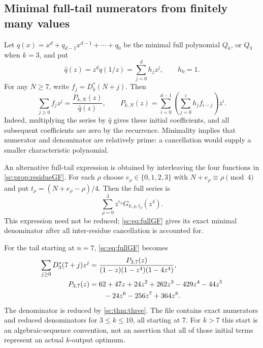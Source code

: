 \documentclass[11pt,a4paper]{article}
\numberwithin{equation}{section}
\theoremstyle{definition}
\theoremstyle{remark}
\begin{document}
\subsection{Minimal full-tail numerators from finitely many values}
Let $q(x)=x^d+q_{d-1}x^{d-1}+\cdots+q_0$ be the minimal full
polynomial $Q_k$, or $Q_3$ when $k=3$, and put
\begin{equation}\label{sc:eq:reciprocal}
 \widehat q(z)=z^dq(1/z)=\sum_{j=0}^d h_jz^j,\qquad h_0=1.
\end{equation}
For any $N\ge7$, write $f_j=D^*_k(N+j)$. Then
\begin{equation}\label{sc:eq:fullGF}
 \sum_{j\ge0}f_jz^j=\frac{P_{k,N}(z)}{\widehat q(z)},\qquad
 P_{k,N}(z)=\sum_{i=0}^{d-1}
       \left(\sum_{j=0}^{i}h_jf_{i-j}\right)z^i.
\end{equation}
Indeed, multiplying the series by $\widehat q$ gives these initial
coefficients, and all subsequent coefficients are zero by the recurrence.
Minimality implies that numerator and denominator are relatively prime:
a cancellation would supply a smaller characteristic polynomial.

An alternative full-tail expression is obtained by interleaving the four
functions in \cref{sc:prop:residueGF}. For each $\rho$ choose
$e_\rho\in\{0,1,2,3\}$ with $N+e_\rho\equiv\rho\pmod4$ and put
$t_\rho=(N+e_\rho-\rho)/4$. Then the full series is
\[
 \sum_{\rho=0}^3 z^{e_\rho}G_{k,\rho,t_\rho}(z^4).
\]
This expression need not be reduced; \eqref{sc:eq:fullGF} gives its exact
minimal denominator after all inter-residue cancellation is accounted for.

\begin{example}
For the tail starting at $n=7$, \eqref{sc:eq:fullGF} becomes
\begin{align}
 \sum_{j\ge0}D_3^*(7+j)z^j
 &=\frac{P_{3,7}(z)}{(1-z)(1-z^4)(1-4z^4)},\label{sc:eq:GF3}\\
 P_{3,7}(z)
 &=62+47z+24z^2+262z^3-429z^4-44z^5\notag\\
 &\qquad-24z^6-256z^7+364z^8.\notag
\end{align}
The denominator is reduced by \cref{sc:thm:three}. The file
 contains exact numerators
and reduced denominators for $3\le k\le10$, all starting at $7$.
For $k>7$ this start is an algebraic-sequence convention, not an assertion
that all of those initial terms represent an actual $k$-output optimum.
\end{example}
\end{document}
